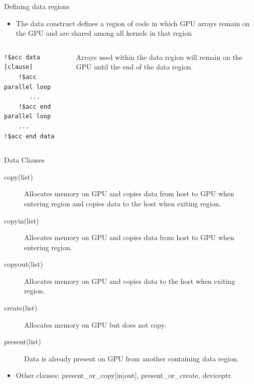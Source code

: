 \documentclass[10pt,t]{beamer}
\begin{document}
\begin{frame}[fragile]{\small Defining data regions}
  \begin{itemize}
    \item The data construct defines a region of code in which GPU arrays remain on the GPU and are shared among all kernels in that region
  \end{itemize}
  \begin{columns}
    \column{9cm}
  \begin{exampleblock}{}
    \begin{columns}[c]
      \column{3.5cm}
      \begin{lstlisting}[basicstyle=\tiny\ttfamily,language=OmpFortran]
!$acc data [clause]
    !$acc parallel loop
       ...
    !$acc end parallel loop
    ...
!$acc end data
      \end{lstlisting}
      \column{0.5cm}
      \fontsize{55}{20}\selectfont{\color{lubrown}\}}
      \column{3cm}
      Arrays used within the data region will remain on the GPU until the end of the data region.
    \end{columns}
  \end{exampleblock}
  \end{columns}
\end{frame}

\begin{frame}{ Data Clauses}
  \begin{description}
    \item[copy(list)] Allocates memory on GPU and copies data from host to GPU when entering region and copies data to the host when exiting region.
    \item[copyin(list)] Allocates memory on GPU and copies data from host to GPU when entering region.
    \item[copyout(list)] Allocates memory on GPU and copies data to the host when exiting region.
    \item[create(list)] Allocates memory on GPU but does not copy.
    \item[present(list)] Data is already present on GPU from another containing data region.
  \end{description}
  \begin{itemize}
    \item Other clauses: {\color{lubrown}present\_or\_copy[in|out]}, {\color{lubrown}present\_or\_create}, {\color{lubrown}deviceptr}.
  \end{itemize}
\end{frame}
\end{document}
